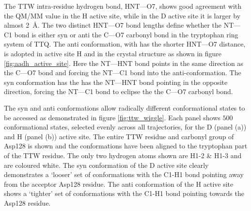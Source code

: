The TTW intra-residue hydrogen bond, HNT---O7, shows good agreement with the QM/MM value in the H active site, while in the D active site it is larger by almost \SI{2}{\angstrom}. The two distinct HNT---O7 bond lengths define whether the NT---C1 bond is either syn or anti the C---O7 carbonyl bond in the tryptophan ring system of TTQ. The anti conformation, with has the shorter HNT---O7 distance, is adopted in active site H and in the crystal structure as shown in figure \ref{fig:aadh_active_site}.  Here the NT---HNT bond points in the same direction as the C---O7 bond and forcing the NT---C1 bond into the anti-conformation. The syn conformation has the has the NT---HNT bond pointing in the opposite direction, forcing the NT---C1 bond to eclipse the the C---O7 carbonyl bond. 

The syn and anti conformations allow radically different conformational states to be accessed as demonstrated in figure \ref{fig:ttw_wiggle}. Each panel shows $500$ conformational states, selected evenly across all trajectories, for the D (panel (a)) and H (panel (b)) active site. The entire TTW residue and carbonyl group of Asp128 is shown and the conformations have been aligned to the tryptophan part of the TTW residue. The only two hydrogen atoms shown are H1-2 \& H1-3 and are coloured white. The syn conformation of the D active site clearly demonstrates a `looser' set of conformations with the  C1-H1 bond pointing away from the acceptor Asp128 residue. The anti conformation of the H active site shows a `tighter' set of conformations with the C1-H1 bond pointing towards the Asp128 residue. 

